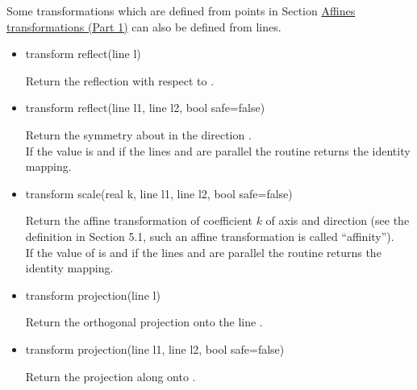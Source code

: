 \documentclass[pdftex]{article}
\begin{document}
Some transformations which are defined from points in Section
\href{#section.transform1}{Affines transformations (Part 1)} can also
be defined from lines.
\begin{itemize}
\item {}
  \begin{Vcolor}
    transform reflect(line l)
  \end{Vcolor}
  Return the reflection with respect to .
\item {}
  \begin{Vcolor}
    transform reflect(line l1, line l2, bool safe=false)
  \end{Vcolor}
  Return the symmetry about  in the direction .\\
  If the value  is   and if the lines 
  and  are parallel the routine returns the identity mapping.
\item {}
  \begin{Vcolor}
    transform scale(real k, line l1, line l2, bool safe=false)
  \end{Vcolor}
  Return the affine transformation of coefficient $k$ of
  axis  and direction  (see the definition in
  Section 5.1, such an affine transformation is called
  ``affinity'').\\
  If the value of  is  and if the
  lines  and  are parallel the routine returns the
  identity mapping.
\item {}
  \begin{Vcolor}
    transform projection(line l)
  \end{Vcolor}
  Return the orthogonal projection onto the line .
\item {}
  \begin{Vcolor}
    transform projection(line l1, line l2, bool safe=false)
  \end{Vcolor}
  Return the projection along  onto .\\

\end{itemize}
\end{document}
